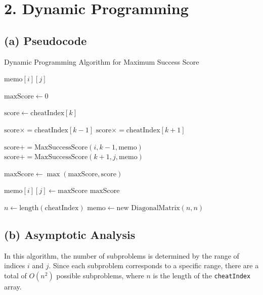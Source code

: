 \documentclass[10pt]{article}
\begin{document}
\section*{2. Dynamic Programming}

\subsection*{(a) Pseudocode}

\begin{algorithm}[H]
  \caption{Dynamic Programming Algorithm for Maximum Success Score}
  \begin{algorithmic}[1]
    \State \Return $\text{memo}[i][j]$
    \EndIf

    \State $\text{maxScore} \gets 0$

    \State $\text{score} \gets \text{cheatIndex}[k]$

    \State $\text{score} \times= \text{cheatIndex}[k-1]$
    \EndIf
    \State $\text{score} \times= \text{cheatIndex}[k+1]$
    \EndIf

    \State $\text{score} += \text{MaxSuccessScore}(i, k-1, \text{memo})$
    \EndIf
    \State $\text{score} += \text{MaxSuccessScore}(k+1, j, \text{memo})$
    \EndIf

    \State $\text{maxScore} \gets \max(\text{maxScore}, \text{score})$
    \EndFor

    \State $\text{memo}[i][j] \gets \text{maxScore}$
    \State \Return $\text{maxScore}$
    \EndFunction

    \State $n \gets \text{length}(\text{cheatIndex})$
    \State $\text{memo} \gets \text{new DiagonalMatrix}(n, n)$
    \State \Return {}
    \EndFunction
  \end{algorithmic}
\end{algorithm}

\subsection*{(b) Asymptotic Analysis}

In this algorithm, the number of subproblems is determined by the range of indices $i$ and $j$. Since each subproblem corresponds to a specific range, there are a total of $O(n^2)$ possible subproblems, where $n$ is the length of the \texttt{cheatIndex} array.
\end{document}
